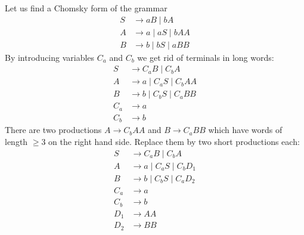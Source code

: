 

\setcounter{section}{5}
\setcounter{subsection}{2}
\setcounter{dfn}{10}

\begin{exl}
Let us find a Chomsky form of the grammar
\begin{align*}
S &\to aB \mid bA\\
A &\to a \mid aS \mid bAA\\
B &\to b \mid bS \mid aBB
\end{align*}
By introducing variables $C_a$ and $C_b$ we get rid of terminals in long words:
\begin{align*}
S &\to C_aB \mid C_bA\\
A &\to a \mid C_aS \mid C_bAA\\
B &\to b \mid C_bS \mid C_aBB\\
C_a &\to a\\
C_b &\to b
\end{align*}
There are two productions $A \to C_bAA$ and $B \to C_aBB$ which have words of length $\ge 3$ on the right hand side.
Replace them by two short productions each:
\begin{align*}
S &\to C_aB \mid C_bA\\
A &\to a \mid C_aS \mid C_bD_1\\
B &\to b \mid C_bS \mid C_aD_2\\
C_a &\to a\\
C_b &\to b\\
D_1 &\to AA\\
D_2 &\to BB
\end{align*}
\end{exl}


